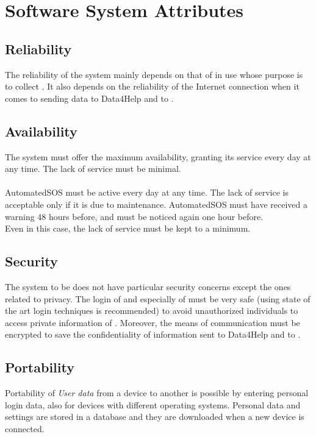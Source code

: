 \documentclass[../../rasd.tex]{subfiles}
\begin{document}
\section{Software System Attributes}
			
			\subsection{Reliability}
			The reliability of the system mainly depends on that of  in use whose purpose is to collect . It also depends on the reliability of the Internet connection when it comes to sending data to Data4Help and to .
			\subsection{Availability}
			The system must offer the maximum availability, granting its service every day at any time. The lack of service must be minimal.\\\\
			AutomatedSOS must be active every day at any time. The lack of service is acceptable only if it is due to maintenance. AutomatedSOS  must have received a warning 48 hours before, and must be noticed again one hour before. \\
			Even in this case, the lack of service must be kept to a minimum.

			\subsection{Security}
			The system to be does not have particular security concerns except the ones related to privacy. The login of  and especially of  must be very safe (using state of the art login techniques is recommended) to avoid unauthorized individuals to access private information of . Moreover, the means of communication must be encrypted to save the confidentiality of information sent to Data4Help and to .
			
			\subsection{Portability}
			Portability of \textit{User data} from a device to another is possible by entering personal login data, also for devices with different operating systems.
			Personal data and settings are stored in a database and they are downloaded when a new device is connected.
\end{document}
